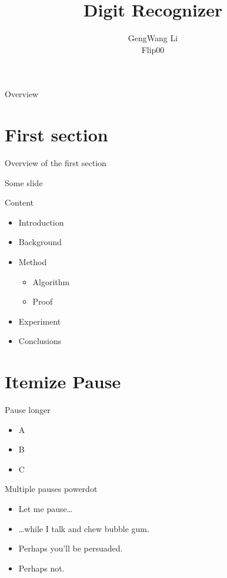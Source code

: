 \documentclass[
 size=12pt,
 paper=smartboard, %
 mode=present, %
 display=slides, %
style=tuliplab,
pauseslide,
fleqn,leqno]{powerdot}
\title{Digit Recognizer}
\author{
GengWang Li
\\
Flip00 
}
\date{\gitCommitterDate}
\begin{document}
\maketitle 

\begin{slide}[toc=,bm=]{Overview}
\tableofcontents[content=sections]
\end{slide}
\section{First section}
\begin{slide}[toc=,bm=]{Overview of the first section}
\tableofcontents[content=currentsection,type=1]
\end{slide}
\begin{slide}{Some slide}
\end{slide}

\begin{slide}{Content}
  \begin{itemize}
    \item Introduction\pause
    \item Background
    \item Method \pause
      \begin{itemize}
      \item Algorithm
      \item Proof
      \end{itemize}
    \item Experiment
    \item Conclusions
  \end{itemize}
\end{slide}


\section{Itemize Pause}


\begin{slide}{Pause longer}
\begin{itemize}
\item A \pause
\item B \pause[2]
\item C
\end{itemize}
\end{slide}


\begin{slide}{Multiple pauses}
power\pause dot \pause
\begin{itemize}
\item Let me pause\ldots \pause
\item \ldots while I talk \pause and chew bubble gum. \pause
\item Perhaps you’ll be persuaded.
\item Perhaps not.
\end{itemize}
\end{slide}
\end{document}
